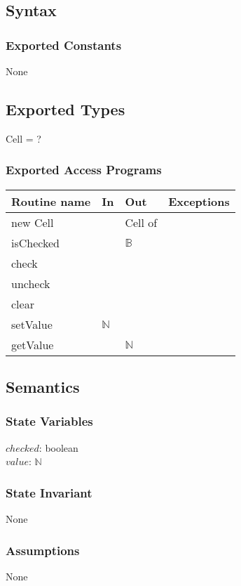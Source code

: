 \documentclass[12pt]{article}
\begin{document}
\subsection* {Syntax}
\subsubsection* {Exported Constants}
None
\subsection* {Exported Types}
Cell = ?

\subsubsection* {Exported Access Programs}

\begin{tabular}{| l | l | l | p{6cm} |}
\hline
\textbf{Routine name} & \textbf{In} & \textbf{Out} & \textbf{Exceptions}\\
\hline
new Cell & & Cell of  & \\
\hline
isChecked & &  $\mathbb{B}$ & \\
\hline
check & && \\
\hline
uncheck & && \\
\hline
clear & && \\
\hline
setValue & $\mathbb{N}$ && \\
\hline
getValue & & $\mathbb{N}$& \\
\hline
\end{tabular}

\subsection* {Semantics}
\subsubsection*{State Variables}
$checked$: boolean\\
$value$: $\mathbb{N}$
\subsubsection* {State Invariant}
None

\subsubsection* {Assumptions}
None
\end{document}
